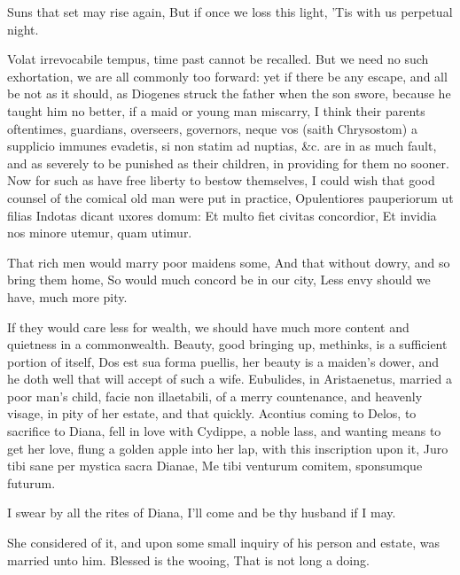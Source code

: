 {Suns that set may rise again,
But if once we loss this light,
'Tis with us perpetual night.

Volat irrevocabile tempus, time past cannot be recalled. But we need no
such exhortation, we are all commonly too forward: yet if there be any
escape, and all be not as it should, as Diogenes struck the father when
the son swore, because he taught him no better, if a maid or young man
miscarry, I think their parents oftentimes, guardians, overseers,
governors, neque vos (saith Chrysostom) a supplicio immunes
evadetis, si non statim ad nuptias, \&c. are in as much fault, and as
severely to be punished as their children, in providing for them no
sooner.
Now for such as have free liberty to bestow themselves, I could wish
that good counsel of the comical old man were put in practice,
Opulentiores pauperiorum ut filias
Indotas dicant uxores domum:
Et multo fiet civitas concordior,
Et invidia nos minore utemur, quam utimur.

That rich men would marry poor maidens some,
And that without dowry, and so bring them home,
So would much concord be in our city,
Less envy should we have, much more pity.

If they would care less for wealth, we should have much more content
and quietness in a commonwealth. Beauty, good bringing up, methinks, is
a sufficient portion of itself, Dos est sua forma puellis, her
beauty is a maiden's dower, and he doth well that will accept of such a
wife. Eubulides, in Aristaenetus, married a poor man's child,
facie non illaetabili, of a merry countenance, and heavenly visage, in
pity of her estate, and that quickly. Acontius coming to Delos, to
sacrifice to Diana, fell in love with Cydippe, a noble lass, and
wanting means to get her love, flung a golden apple into her lap, with
this inscription upon it,
Juro tibi sane per mystica sacra Dianae,
Me tibi venturum comitem, sponsumque futurum.

I swear by all the rites of Diana,
I'll come and be thy husband if I may.

She considered of it, and upon some small inquiry of his person and
estate, was married unto him.
Blessed is the wooing,
That is not long a doing.

}
